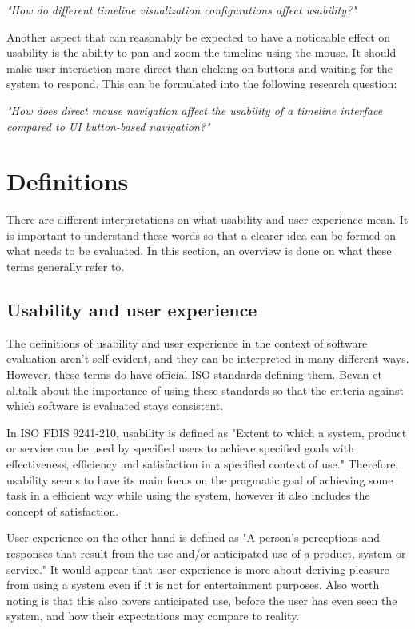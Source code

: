 \textit{"How do different timeline visualization configurations affect usability?"}

Another aspect that can reasonably be expected to have a noticeable effect on usability is the ability to pan and zoom the timeline using the mouse. It should make user interaction more direct than clicking on buttons and waiting for the system to respond. This can be formulated into the following research question:

\textit{"How does direct mouse navigation affect the usability of a timeline interface compared to UI button-based navigation?"}

\section{Definitions}
There are different interpretations on what usability and user experience mean. It is important to understand these words so that a clearer idea can be formed on what needs to be evaluated. In this section, an overview is done on what these terms generally refer to.

\subsection{Usability and user experience} \label{definitions_section}
The definitions of usability and user experience in the context of software evaluation aren't self-evident, and they can be interpreted in many different ways. However, these terms do have official ISO standards defining them. Bevan et al.talk about the importance of using these standards so that the criteria against which software is evaluated stays consistent. \cite{bevanstandard}

In  ISO FDIS 9241-210, usability is defined as "Extent to which  a system, product or service can be used by specified users to achieve specified goals with effectiveness, efficiency and satisfaction in a specified context of use." Therefore, usability seems to have its main focus on the pragmatic goal of achieving some task in a efficient way while using the system, however it also includes the concept of satisfaction.

User experience on the other hand is defined as "A person's perceptions and responses that result from the use and/or anticipated use of a product, system or service." It would appear that user experience is more about deriving pleasure from using a system even if it is not for entertainment purposes. Also worth noting is that this also covers anticipated use, before the user has even seen the system, and how their expectations may compare to reality.

